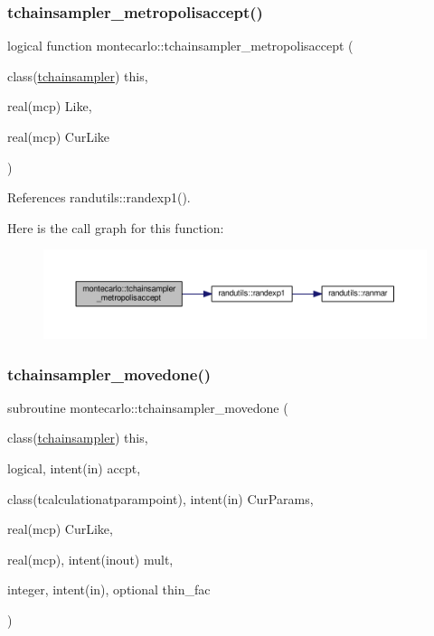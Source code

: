 \subsubsection{\texorpdfstring{tchainsampler\+\_\+metropolisaccept()}{tchainsampler\_metropolisaccept()}}
{\footnotesize\ttfamily logical function montecarlo\+::tchainsampler\+\_\+metropolisaccept (\begin{DoxyParamCaption}\item[{class(\mbox{\hyperlink{structmontecarlo_1_1tchainsampler}{tchainsampler}})}]{this,  }\item[{real(mcp)}]{Like,  }\item[{real(mcp)}]{Cur\+Like }\end{DoxyParamCaption})\hspace{0.3cm}{\ttfamily [private]}}



References randutils\+::randexp1().

Here is the call graph for this function\+:
\nopagebreak
\begin{figure}[H]
\begin{center}
\leavevmode
\includegraphics[width=350pt]{namespacemontecarlo_a61aacaca86a2550ede828d05b6b4a00f_cgraph}
\end{center}
\end{figure}
\mbox{\label{namespacemontecarlo_a51f39aa0229577c81fd7299edea28876}} 
\subsubsection{\texorpdfstring{tchainsampler\+\_\+movedone()}{tchainsampler\_movedone()}}
{\footnotesize\ttfamily subroutine montecarlo\+::tchainsampler\+\_\+movedone (\begin{DoxyParamCaption}\item[{class(\mbox{\hyperlink{structmontecarlo_1_1tchainsampler}{tchainsampler}})}]{this,  }\item[{logical, intent(in)}]{accpt,  }\item[{class(tcalculationatparampoint), intent(in)}]{Cur\+Params,  }\item[{real(mcp)}]{Cur\+Like,  }\item[{real(mcp), intent(inout)}]{mult,  }\item[{integer, intent(in), optional}]{thin\+\_\+fac }\end{DoxyParamCaption})\hspace{0.3cm}{\ttfamily [private]}}

